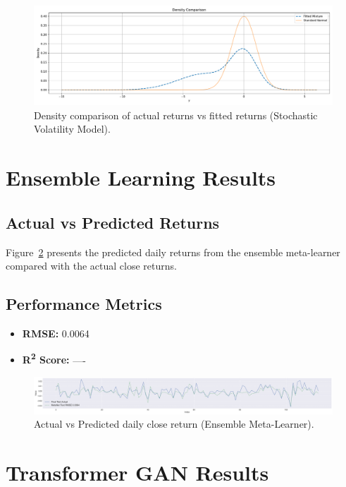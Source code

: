 \begin{figure}[h!]
    \centering
    \includegraphics[width=\textwidth]{Images/stochastic_volatility_density.pdf}
    \caption{Density comparison of actual returns vs fitted returns (Stochastic Volatility Model).}
    \label{fig:sv_density}
\end{figure}

\section{Ensemble Learning Results}
\subsection{Actual vs Predicted Returns}
Figure~\ref{fig:ensemble_actual_vs_pred} presents the predicted daily returns from the ensemble meta-learner compared with the actual close returns.

\subsection{Performance Metrics}
\begin{itemize}
    \item \textbf{RMSE:} 0.0064
    \item \textbf{R\textsuperscript{2} Score:} ----
\end{itemize}

\begin{figure}[h!]
    \centering
    \includegraphics[width=\textwidth]{Images/metanet_final_test_plot_s.pdf}
    \caption{Actual vs Predicted daily close return (Ensemble Meta-Learner).}
    \label{fig:ensemble_actual_vs_pred}
\end{figure}

\section{Transformer GAN Results}
